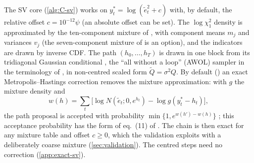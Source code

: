 The SV core (\cref{alg:C-sv}) works on $y^*_t = \log(\tilde e_t^2 + c)$ with, by default, the relative offset
$c = 10^{-12}\psi$ (an absolute offset can be set). %
The $\log\chi^2_1$ density is approximated by the ten-component mixture of \citet{omori2007stochastic},
with component means $m_j$ and variances $v_j$ (the seven-component mixture of \citet{kim1998stochastic}
is an option), and the indicators are drawn by inverse CDF. %
The path $(h_0, \dots, h_T)$ is drawn in one block from its tridiagonal Gaussian conditional
\citep{rue2001fast,chan2009efficient,mccausland2011simulation}, the ``all without a loop'' (AWOL)
sampler in the terminology of \citet{kastner2014ancillarity}, in non-centred scaled form
$\tilde Q = \sigma^2 Q$.
By default () an exact Metropolis--Hastings correction removes the mixture
approximation: with $g$ the mixture density and
\begin{equation}\label{eq:w}
  w(h) = \sum_t \bigl[\log N(\tilde e_t; 0, e^{h_t}) - \log g(y^*_t - h_t)\bigr],
\end{equation}
the path proposal is accepted with probability $\min\{1, e^{w(h') - w(h)}\}$
\citep[Algorithm~3]{delnegro2015time}; this acceptance probability has the form of eq.~(11) of
\citet{stroud2003nonlinear}. %
The chain is then exact for any mixture table and offset $c \ge 0$, which the validation exploits with a
deliberately coarse mixture (\cref{sec:validation}). %
The centred steps need no correction (\cref{app:exact-sv}). %
